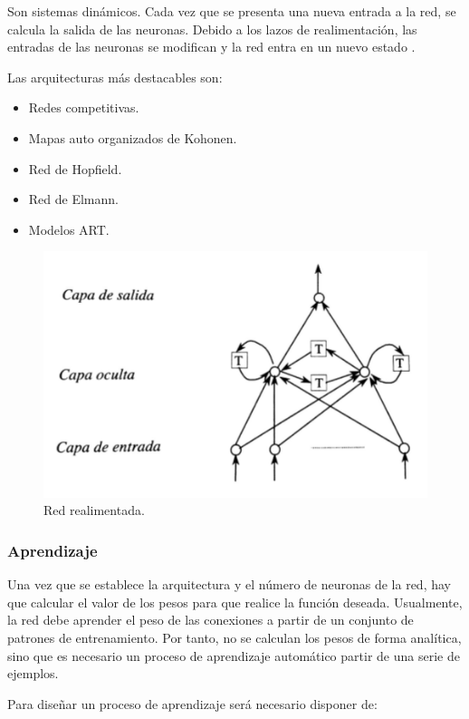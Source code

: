 		Son sistemas dinámicos. Cada vez que se presenta una nueva entrada a la red, se calcula la salida de las neuronas. Debido a los lazos de realimentación, las entradas de las neuronas se modifican y la red entra en un nuevo estado \cite{Faundez2001}.

		Las arquitecturas más destacables son:

		\begin{itemize}
			\item Redes competitivas.
			\item Mapas auto organizados de Kohonen.
			\item Red de Hopfield.
			\item Red de Elmann.
			\item Modelos ART.
		\end{itemize}

		\begin{figure}[H]
			\centering
			\includegraphics[width=0.8\linewidth]{figures/redRealimentada}
			\caption{Red realimentada.}
			\label{fig:redRealimentada}
		\end{figure}	

		\subsubsection{Aprendizaje}

		Una vez que se establece la arquitectura y el número de neuronas de la red, hay que calcular el valor de los pesos para que realice la función deseada. Usualmente, la red debe aprender el peso de las conexiones a partir de un conjunto de patrones de entrenamiento. Por tanto, no se calculan los pesos de forma analítica, sino que es necesario un proceso de aprendizaje automático  partir de una serie de ejemplos.

		Para diseñar un proceso de aprendizaje será necesario disponer de:

